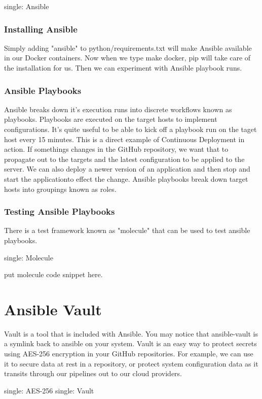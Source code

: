 single: Ansible

\subsubsection{Installing Ansible}
\justify
Simply adding "ansible" to python/requirements.txt will make Ansible
available in our Docker containers. Now when we type make docker, pip
will take care of the installation for us. Then we can experiment with
Ansible playbook runs.

\subsubsection{Ansible Playbooks}
\justify
Ansible breaks down it's execution runs into discrete workflows known as
playbooks. Playbooks are executed on the target hosts to implement
configurations. It's quite useful to be able to kick off a playbook run
on the taget host every 15 minutes. This is a direct example of
Continuous Deployment in action. If somethings changes in the GitHub
repository, we want that to propagate out to the targets and the latest
configuration to be applied to the server. We can also deploy a newer
version of an application and then stop and start the applicationto
effect the change.
\justify
Ansible playbooks break down target hosts into groupings known as roles.

\subsubsection{Testing Ansible Playbooks}
\justify
There is a test framework known as "molecule" that can be used to test
ansible playbooks.

single: Molecule

put molecule code snippet here.

\section{Ansible Vault}
\justify
Vault is a tool that is included with Ansible. You may notice that
ansible-vault is a symlink back to ansible on your system. Vault is an
easy way to protect secrets using AES-256 encryption in your GitHub
repositories. For example, we can use it to secure data at rest in a
repository, or protect system configuration data as it transits through
our pipelines out to our cloud providers.

single: AES-256 single: Vault

